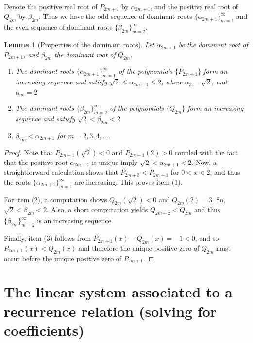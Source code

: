 \documentclass[11pt]{amsart}
\numberwithin{equation}{section}
\theoremstyle{plain}
\newtheorem{lem}[thm]{Lemma}
\begin{document}
Denote the positive real root  of $P_{2m+1}$ by 
$\alpha_{2m+1}$, and the positive real root of $Q_{2m}$ by 
 $\beta_{2m}$. 
 Thus we have the odd sequence of dominant roots 
 $\{\alpha_{2m+1}\}_{m=1}^{\infty}$ and the even sequence of dominant roots 
$\{\beta_{2m}\}_{m=2}^{\infty}$.

\begin{lem}[Properties of the dominant roots] Let $\alpha_{2m+1}$ be the dominant root of $P_{2m+1}$, and $\beta_{2m}$ the dominant root of $Q_{2m}$. 
\begin{enumerate}
\item The dominant roots $\{\alpha_{2m+1}\}_{m=1}^{\infty}$ of the polynomials $\{P_{2m+1}\}$ form an increasing sequence and satisfy
 $\sqrt{2} \leq  \alpha_{2m+1} \leq 2$, where 
 $\alpha_{3}=\sqrt{2}$, and $\alpha_{\infty}=2$
 \item The dominant roots $\{\beta_{2m}\}_{m=2}^{\infty}$ of the polynomials $\{Q_{2m}\}$
form an increasing sequence  and satisfy 
 $\sqrt{2} < \beta_{2m} <2$
\item $\beta_{2m} < \alpha_{2m+1}$ for $m=2,3,4,...$.
\end{enumerate}
\end{lem}

\begin{proof}
Note that $P_{2m+1}(\sqrt{2})<0$ and $P_{2m+1}(2) >0$ coupled with the fact that the positive root $\alpha_{2m+1}$ is unique imply 
$\sqrt{2}<\alpha_{2m+1} <2$. Now, a straightforward calculation shows that $P_{2m+3}<P_{2m+1}$ for 
$0<x<2$, and thus the roots 
$\{\alpha_{2m+1}\}_{m=1}^{\infty}$
are increasing.  This proves item (1). 

For item (2), a computation shows 
$Q_{2m}(\sqrt{2})<0$ and $Q_{2m}(2)=3$. So,
$\sqrt{2} <\beta_{2m} < 2$. Also, a short  computation yields
$Q_{2m+2} <Q_{2m}$ and thus 
$\{\beta_{2m}\}_{m=2}^{\infty}$ is an increasing sequence. 

Finally, item (3)  follows from 
$P_{2m+1}(x)-Q_{2m}(x)=-1<0$, and so 
$P_{2m+1}(x)<Q_{2m}(x)$ and therefore  the unique positive zero of 
$Q_{2m}$   must occur before the unique positive zero of $P_{2m+1}$.
\end{proof}


\section{The linear system associated to a  recurrence relation (solving for coefficients)}\label{sec: linear system}
\end{document}
